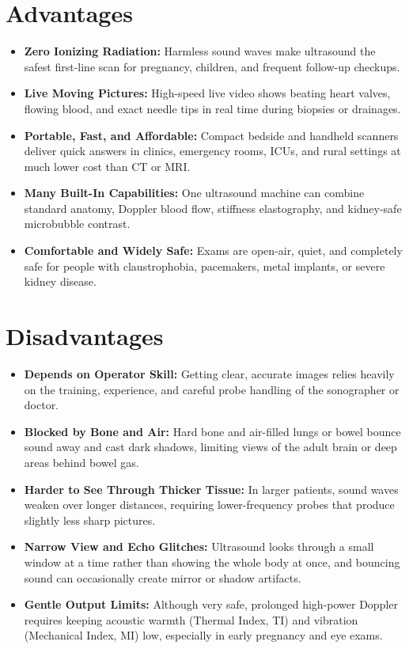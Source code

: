 \section{Advantages}
\begin{itemize}
  \item \textbf{Zero Ionizing Radiation:} Harmless sound waves make ultrasound the safest first-line scan for pregnancy, children, and frequent follow-up checkups.
  \item \textbf{Live Moving Pictures:} High-speed live video shows beating heart valves, flowing blood, and exact needle tips in real time during biopsies or drainages.
  \item \textbf{Portable, Fast, and Affordable:} Compact bedside and handheld scanners deliver quick answers in clinics, emergency rooms, ICUs, and rural settings at much lower cost than CT or MRI.
  \item \textbf{Many Built-In Capabilities:} One ultrasound machine can combine standard anatomy, Doppler blood flow, stiffness elastography, and kidney-safe microbubble contrast.
  \item \textbf{Comfortable and Widely Safe:} Exams are open-air, quiet, and completely safe for people with claustrophobia, pacemakers, metal implants, or severe kidney disease.
\end{itemize}

\section{Disadvantages}
\begin{itemize}
  \item \textbf{Depends on Operator Skill:} Getting clear, accurate images relies heavily on the training, experience, and careful probe handling of the sonographer or doctor.
  \item \textbf{Blocked by Bone and Air:} Hard bone and air-filled lungs or bowel bounce sound away and cast dark shadows, limiting views of the adult brain or deep areas behind bowel gas.
  \item \textbf{Harder to See Through Thicker Tissue:} In larger patients, sound waves weaken over longer distances, requiring lower-frequency probes that produce slightly less sharp pictures.
  \item \textbf{Narrow View and Echo Glitches:} Ultrasound looks through a small window at a time rather than showing the whole body at once, and bouncing sound can occasionally create mirror or shadow artifacts.
  \item \textbf{Gentle Output Limits:} Although very safe, prolonged high-power Doppler requires keeping acoustic warmth (Thermal Index, TI) and vibration (Mechanical Index, MI) low, especially in early pregnancy and eye exams.
\end{itemize}

